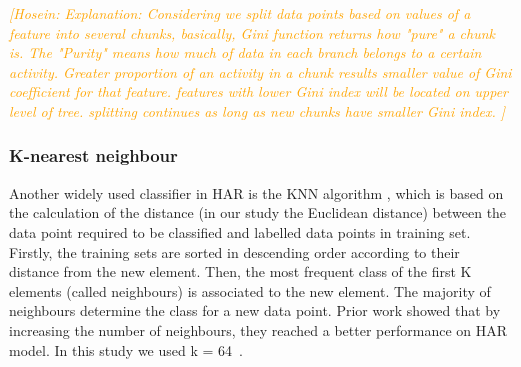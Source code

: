\documentclass[journal,article,submit,moreauthors,pdftex]{Definitions/mdpi}
\newcommand{\hosein}[1]{\textcolor{orange}{{\it [Hosein: #1]}}}
\begin{document}
\hosein{Explanation: Considering we split data points based on values of a feature into several chunks, basically, Gini function returns how "pure" a chunk is. The "Purity" means how much of data in each branch belongs to a certain activity. Greater proportion of an activity in a chunk results smaller value of Gini coefficient for that feature. features with lower Gini index will be located on upper level of tree. splitting continues as long as new chunks have smaller Gini index. }


\subsubsection{K-nearest neighbour}
Another widely used classifier in HAR is the KNN algorithm \cite{wang2019survey,shakya2018comparative}, which is based on the calculation of the distance (in our study the Euclidean distance) between the data point required to be classified and labelled data points in training set.  Firstly, the training sets are sorted in descending order according to their distance from the new element. Then, the most frequent class of the first K elements (called neighbours) is associated to the new element. The majority of neighbours determine the class for a new data point. Prior work showed that by increasing the number of neighbours, they reached a better performance on HAR model. In this study we used k = 64~\cite{kose2012online}.
\end{document}
